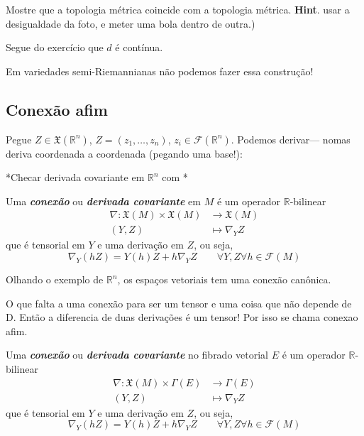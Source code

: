 \begin{exercise}\leavevmode
Mostre que a topologia métrica coincide com a topologia métrica. \textbf{Hint}. usar a desigualdade da foto, e meter uma bola dentro de outra.)
\end{exercise}

Segue do exercício 	que \(d\) é contínua.

\begin{remark}\leavevmode
Em variedades semi-Riemannianas não podemos fazer essa construção!
\end{remark}

\subsection{Conexão afim}

Pegue \(Z \in \mathfrak{X}(\mathbb{R}^n)\), \(Z=(z_1,\ldots,z_n)\), \(z_i \in \mathcal{F}(\mathbb{R}^n)\). Podemos derivar--- nomas deriva coordenada a coordenada {\color{7}(pegando uma  base!)}:

*Checar derivada covariante em \(\mathbb{R}^n\) com \cite{tud}*

\begin{defn}\leavevmode
Uma \textit{\textbf{conexão}} ou \textit{\textbf{derivada covariante}} em \(M\) é um operador \(\mathbb{R}\)-bilinear
\begin{align*}
	\nabla: \mathfrak{X}(M) \times \mathfrak{X}(M) &\longrightarrow \mathfrak{X}(M) \\
	(Y,Z) &\longmapsto \nabla_YZ
\end{align*}
que é tensorial em \(Y\) e uma derivação em \(Z\), ou seja,
\[\nabla_Y(hZ)=Y(h)Z+h\nabla_YZ\qquad  \forall  Y,Z \forall h \in \mathcal{F}(M)\]
\end{defn}

Olhando o exemplo de \(\mathbb{R}^n\), os espaços vetoriais tem uma conexão canônica.

O que falta a uma conexão para ser um tensor e uma coisa que não depende de D. Então a diferencia de duas derivações é um tensor! Por isso se chama conexao afim.

\begin{defn}\leavevmode
Uma \textit{\textbf{conexão}} ou \textit{\textbf{derivada covariante}} no fibrado vetorial \(E\) é um operador \(\mathbb{R}\)-bilinear
\begin{align*}
	\nabla: \mathfrak{X}(M) \times \Gamma(E) &\longrightarrow \Gamma(E) \\
	(Y,Z) &\longmapsto \nabla_YZ
\end{align*}
que é tensorial em \(Y\) e uma derivação em \(Z\), ou seja,
\[\nabla_Y(hZ)=Y(h)Z+h\nabla_YZ\qquad  \forall  Y,Z \forall h \in \mathcal{F}(M)\]
\end{defn}

